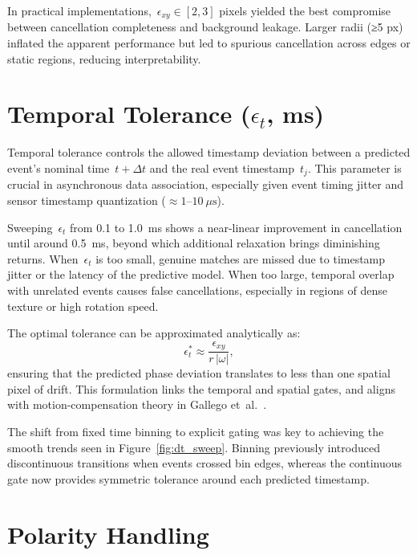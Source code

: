 In practical implementations,~\(\epsilon_{xy}\in[2,3]\) pixels yielded the best compromise between cancellation completeness and background leakage.
Larger radii (≥5 px) inflated the apparent performance but led to spurious cancellation across edges or static regions, reducing interpretability.

\section{Temporal Tolerance (\( \epsilon_{t} \), ms)}
\label{sec:temporal_tolerance}

Temporal tolerance controls the allowed timestamp deviation between a predicted event’s nominal time~\(t+\Delta t\) and the real event timestamp~\(t_j\).
This parameter is crucial in asynchronous data association, especially given event timing jitter and sensor timestamp quantization (\( \approx 1\text{--}10~\mu\text{s} \)).

Sweeping~\(\epsilon_t\) from 0.1 to 1.0~ms shows a near-linear improvement in cancellation until around 0.5~ms, beyond which additional relaxation brings diminishing returns.
When~\(\epsilon_t\) is too small, genuine matches are missed due to timestamp jitter or the latency of the predictive model.
When too large, temporal overlap with unrelated events causes false cancellations, especially in regions of dense texture or high rotation speed.

The optimal tolerance can be approximated analytically as:
\[
\epsilon_t^{*} \approx \frac{\epsilon_{xy}}{r\,|\omega|},
\]
ensuring that the predicted phase deviation translates to less than one spatial pixel of drift.
This formulation links the temporal and spatial gates, and aligns with motion-compensation theory in Gallego et~al.~\cite{Gallego2018CMax, Xu2020}.

The shift from fixed time binning to explicit gating was key to achieving the smooth trends seen in Figure~\ref{fig:dt_sweep}.
Binning previously introduced discontinuous transitions when events crossed bin edges, whereas the continuous gate now provides symmetric tolerance around each predicted timestamp.

\section{Polarity Handling}
\label{sec:polarity}


